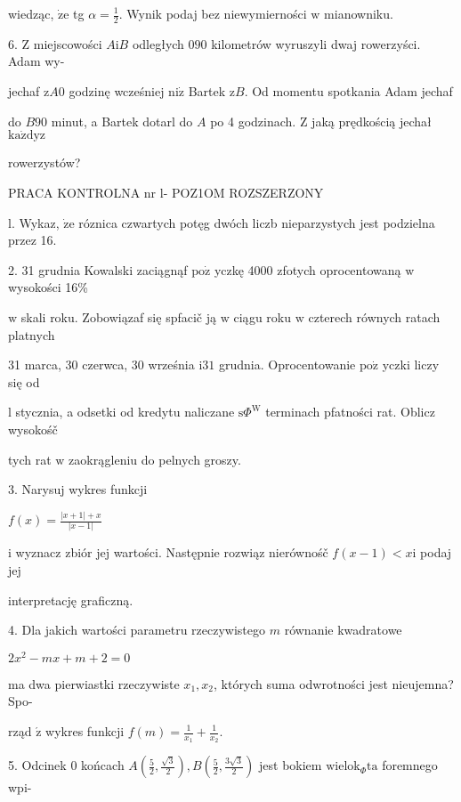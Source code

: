 \documentclass[a4paper,12pt]{article}
\begin{document}
wiedząc, $\dot{\mathrm{z}}\mathrm{e}$ tg $\displaystyle \alpha=\frac{1}{2}$. Wynik podaj bez niewymierności $\mathrm{w}$ mianowniku.

6. $\mathrm{Z}$ miejscowości $A\mathrm{i}B$ odległych $090$ kilometrów wyruszyli dwaj rowerzyści. Adam wy-

jechaf $\mathrm{z} A0$ godzinę wcześniej $\mathrm{n}\mathrm{i}\dot{\mathrm{z}}$ Bartek $\mathrm{z} B$. Od momentu spotkania Adam jechaf

do $B90$ minut, a Bartek dotarl do $A$ po 4 godzinach. $\mathrm{Z}$ jaką prędkością jechał $\mathrm{k}\mathrm{a}\dot{\mathrm{z}}\mathrm{d}\mathrm{y}\mathrm{z}$

rowerzystów?




PRACA KONTROLNA nr l- POZ1OM ROZSZERZONY

l. Wykaz, $\dot{\mathrm{z}}\mathrm{e}$ róznica czwartych potęg dwóch liczb nieparzystych jest podzielna przez 16.

2. 31 grudnia Kowalski zaciągnąf $\mathrm{p}\mathrm{o}\dot{\mathrm{z}}$ yczkę 4000 zfotych oprocentowaną $\mathrm{w}$ wysokości 16\%

$\mathrm{w}$ skali roku. Zobowiązaf się spfacič ją $\mathrm{w}$ ciągu roku $\mathrm{w}$ czterech równych ratach platnych

31 marca, 30 czerwca, 30 września $\mathrm{i}31$ grudnia. Oprocentowanie $\mathrm{p}\mathrm{o}\dot{\mathrm{z}}$ yczki liczy się od

l stycznia, a odsetki od kredytu naliczane $\mathrm{s}\Phi^{\mathrm{W}}$ terminach pfatności rat. Oblicz wysokośč

tych rat $\mathrm{w}$ zaokrągleniu do pelnych groszy.

3. Narysuj wykres funkcji

$f(x)=\displaystyle \frac{|x+1|+x}{|x-1|}$

$\mathrm{i}$ wyznacz zbiór jej wartości. Następnie rozwiąz nierównośč $f(x-1) < x \mathrm{i}$ podaj jej

interpretację graficzną.

4. Dla jakich wartości parametru rzeczywistego $m$ równanie kwadratowe

$2x^{2}-mx+m+2=0$

ma dwa pierwiastki rzeczywiste $x_{1}, x_{2}$, których suma odwrotności jest nieujemna? Spo-

rząd $\acute{\mathrm{z}}$ wykres funkcji $f(m)=\displaystyle \frac{1}{x_{1}}+\frac{1}{x_{2}}.$

5. Odcinek $0$ końcach $A(\displaystyle \frac{5}{2},\frac{\sqrt{3}}{2}), B(\displaystyle \frac{5}{2},\frac{3\sqrt{3}}{2})$ jest bokiem $\mathrm{w}\mathrm{i}\mathrm{e}\mathrm{l}\mathrm{o}\mathrm{k}_{\Phi}\mathrm{t}\mathrm{a}$ foremnego wpi-
\end{document}

